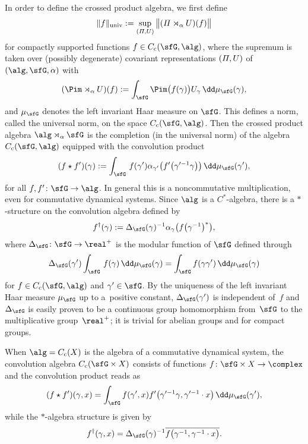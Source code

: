 In order to define the crossed product
algebra, we first define
\[
\|f\|_{\rm univ} := \sup_{({\mit\Pi},U)} \big\|({\mit\Pi}\rtimes_\alpha U)(f)\big\|
\]
for compactly supported functions $f\in C_{\rm c}(\sfG,\alg) $, where the supremum is taken
over (possibly degenerate) covariant representations
$({\mit\Pi},U)$ of $(\alg, \sfG, \alpha)$ with
\[
(\Pim\rtimes_\alpha U)(f) := \int_\sfG
\Pim\big(f(\gamma)\big) U_\gamma\, \dd\mu_\sfG(\gamma) ,
\]
and $\mu_\sfG$ denotes the left invariant Haar measure on $\sfG$. This defines a norm, called the universal norm, on the
space $C_{\rm c}(\sfG,\alg)$.
Then the crossed product algebra $\alg\rtimes_\alpha \sfG$ is the
completion (in the universal norm) of the algebra $C_{\rm c}(\sfG,\alg)$
equipped with the convolution product
\begin{gather}\label{eq:convproduct}
(f\star f')(\gamma) := \int_\sfG\, f(\gamma') \alpha_{\gamma'}\big(f'\big(\gamma'^{-1} \gamma\big)\big)\, \dd \mu_\sfG(\gamma')
,
\end{gather}
for all $f,f'\colon \sfG\to\alg$. In general this is a noncommutative
multiplication, even for commutative dynamical systems.
Since $\alg$ is a $C^*$-algebra, there is a $*$-structure on the
convolution algebra defined by
\[
f^\dag(\gamma):= \Delta_\sfG(\gamma)^{-1} \alpha_\gamma\big(f\big(\gamma^{-1}\big)^*\big) ,
\]
where $\Delta_\sfG\colon \sfG\to \real^+$ is the modular function of
$\sfG$ defined through
\[
\Delta_\sfG(\gamma')
\int_\sfG\,f(\gamma)\,\dd\mu_\sfG(\gamma)=\int_\sfG f(\gamma \gamma')\,\dd\mu_\sfG(\gamma)
\]
for $f\in C_{\rm c}(\sfG,\alg)$ and $\gamma'\in \sfG$. By the uniqueness of the left
invariant Haar measure $\mu_\sfG$ up to a~positive
constant, $\Delta_\sfG(\gamma')$ is independent of~$f$
and $\Delta_\sfG$ is easily proven to be a continuous group homomorphism from~$\sfG$ to the
multiplicative group~$\real^+$; it is trivial for abelian groups and for compact
groups.

When $\alg=C_{\rm c}(X)$
is the algebra of a commutative dynamical system, the convolution
algebra $C_{\rm c}(\sfG\times X)$ consists of functions $f\colon\sfG\times X\to\complex$ and the
convolution product reads as
\[
(f\star f')(\gamma,x) = \int_\sfG f(\gamma',x)
f'\big(\gamma'^{-1} \gamma,\gamma'^{-1}\cdot x\big)\, \dd \mu_\sfG(\gamma') ,
\]
while the $*$-algebra structure is given by
\[
f^\dag(\gamma,x) = \Delta_\sfG(\gamma)^{-1} \overline{f\big(\gamma^{-1},\gamma^{-1}\cdot x\big)} .
\]
